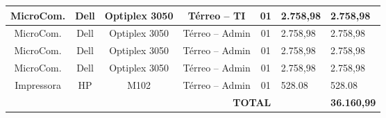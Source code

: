 \begin{table}[H]
\begin{tabular}{|c|c|c|c|c|l|l|}
MicroCom.                                                & Dell                          & Optiplex 3050                                                                                 & Térreo – TI          & 01              & 2.758,98                                                                                & 2.758,98                                                                             \\ \hline
MicroCom.                                                & Dell                          & Optiplex 3050                                                                                 & Térreo – Admin       & 01              & 2.758,98                                                                                & 2.758,98                                                                             \\ \hline
MicroCom.                                                & Dell                          & Optiplex 3050                                                                                 & Térreo – Admin       & 01              & 2.758,98                                                                                & 2.758,98                                                                             \\ \hline
MicroCom.                                                & Dell                          & Optiplex 3050                                                                                 & Térreo – Admin       & 01              & 2.758,98                                                                                & 2.758,98                                                                             \\ \hline
Impressora                                               & HP                            & M102                                                                                          & Térreo – Admin       & 01              & 528.08                                                                                  & 528.08                                                                               \\ \hline
\multicolumn{1}{|l|}{}                                   & \multicolumn{1}{l|}{}         & \multicolumn{1}{l|}{}                                                                         & \multicolumn{3}{c|}{\textbf{TOTAL}}                                                                                              & \textbf{36.160,99} 
 \\ \hline
 
\end{tabular}
\end{table}